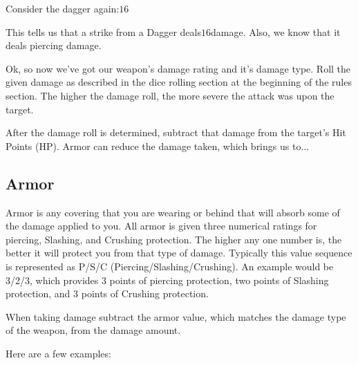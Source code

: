 \documentclass[twoside]{book}
\begin{document}
    {  
    Consider the dagger again:\ensuremath{1}\ensuremath{6}\ensuremath{}
    }
  
    {  
    This tells us that a strike from a Dagger deals\ensuremath{1}\ensuremath{6}\ensuremath{}damage. Also, we know that it deals piercing damage.
    }
  
    {  
    Ok, so now we've got our weapon's damage rating and it's damage type. Roll the given damage as described in the dice rolling section at the beginning of the rules section. The higher the damage roll, the more severe the attack was upon the target.
    }
  
    {  
    After the damage roll is determined, subtract that damage from the target's Hit Points (HP). Armor can reduce the damage taken, which brings us to...
    }
  
    

\subsection{Armor}
    
    {  
    Armor is any covering that you are wearing or behind that will absorb some of the damage applied to you. All armor is given three numerical ratings for piercing, Slashing, and Crushing protection. The higher any one number is, the better it will protect you from that type of damage. Typically this value sequence is represented as P/S/C (Piercing/Slashing/Crushing). An example would be 3/2/3, which provides 3 points of piercing protection, two points of Slashing protection, and 3 points of Crushing protection.
    }
  
    {  
    When taking damage subtract the armor value, which matches the damage type of the weapon, from the damage amount.
    }
  
    {  
    Here are a few examples:
    }
  
  

  
\end{document}
